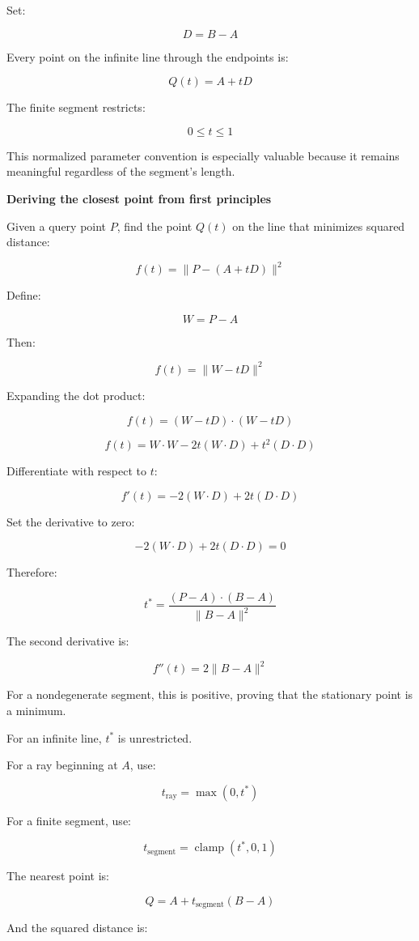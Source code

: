 Set:

\[
D=B-A
\]

Every point on the infinite line through the endpoints is:

\[
Q(t)=A+tD
\]

The finite segment restricts:

\[
0\le t\le1
\]

This normalized parameter convention is especially valuable because it remains meaningful regardless of the segment's length.

\textbf{Deriving the closest point from first principles}

Given a query point \(P\), find the point \(Q(t)\) on the line that minimizes squared distance:

\[
f(t)=\|P-(A+tD)\|^2
\]

Define:

\[
W=P-A
\]

Then:

\[
f(t)=\|W-tD\|^2
\]

Expanding the dot product:

\[
f(t) =(W-tD)\cdot(W-tD)
\]

\[
f(t)=W\cdot W-2t(W\cdot D)+t^2(D\cdot D)
\]

Differentiate with respect to \(t\):

\[
f'(t)=-2(W\cdot D)+2t(D\cdot D)
\]

Set the derivative to zero:

\[
-2(W\cdot D)+2t(D\cdot D)=0
\]

Therefore:

\[
\boxed{ t^*=\frac{(P-A)\cdot(B-A)}{\|B-A\|^2} }
\]

The second derivative is:

\[
f''(t)=2\|B-A\|^2
\]

For a nondegenerate segment, this is positive, proving that the stationary point is a minimum.

For an infinite line, \(t^*\) is unrestricted.

For a ray beginning at \(A\), use:

\[
t_{\mathrm{ray}}=\max(0,t^*)
\]

For a finite segment, use:

\[
\boxed{ t_{\mathrm{segment}}=\operatorname{clamp}(t^*,0,1) }
\]

The nearest point is:

\[
\boxed{ Q=A+t_{\mathrm{segment}}(B-A) }
\]

And the squared distance is:

